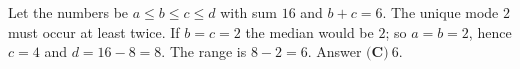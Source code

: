Let the numbers be $a\le b\le c\le d$ with sum $16$ and $b+c=6$. The unique mode $2$ must occur at least twice. If $b=c=2$ the median would be $2$; so $a=b=2$, hence $c=4$ and $d=16-8=8$. The range is $8-2=6$. Answer $\boxed{\textbf{(C)}\ 6}$.
